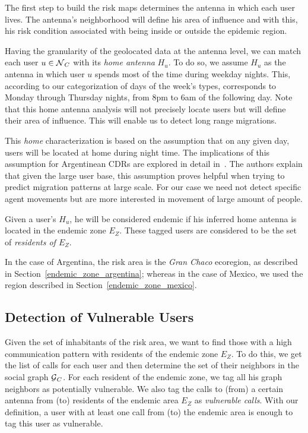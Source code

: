 The first step to build the risk maps determines the antenna in which each user lives. The antenna's neighborhood will define his area of influence and with this, his risk condition associated with being inside or outside the epidemic region.

Having the granularity of the geolocated data at the antenna level, we can match each user $u \in \operatorname{\mathcal{N}}_C$ with its \textit{home antenna} $H_u$. To do so, we assume $H_u$ as the antenna in which user $u$ spends most of the time during weekday nights. This, according to our categorization of days of the week's types, corresponds to Monday through Thursday nights, from 8pm to 6am of the following day. Note that this home antenna analysis will not precisely locate users but will define their area of influence. This will enable us to detect long range migrations.

This \textit{home} characterization is based on the assumption that on any given day, users will be located at home during night time. The implications of this assumption for Argentinean CDRs are explored in detail in~\cite{sarraute2015socialevents,csaji2012exploring}. The authors explain that given the large user base, this assumption proves helpful when trying to predict migration patterns at large scale. For our case we need not detect specific agent movements but are more interested in movement of large amount of people.

Given a user's $H_u$, he will be considered endemic if his inferred home antenna is located in the endemic zone $E_Z$. These tagged users are considered to be the set of \textit{residents of $E_Z$}.

In the case of Argentina, the risk area is the \textit{Gran Chaco} ecoregion, as described in Section~\cref{endemic_zone_argentina};
whereas in the case of Mexico, we used the region described in Section~\cref{endemic_zone_mexico}.


\subsection{Detection of Vulnerable Users}

Given the set of inhabitants of the risk area, we want to find those with a high communication pattern with residents of the endemic zone $E_Z$. To do this, we get the list of calls for each user and then determine the set of their neighbors in the social graph $\operatorname{\mathcal{G}}_C$. For each resident of the endemic zone, we tag all his graph neighbors as potentially vulnerable. We also tag the calls to (from) a certain antenna from (to) residents of the endemic area $E_Z$ as \textit{vulnerable calls}. With our definition, a user with at least one call from (to) the endemic area is enough to tag this user as vulnerable.

